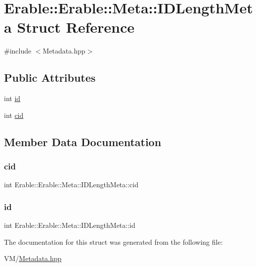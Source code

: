 \hypertarget{struct_erable_1_1_erable_1_1_meta_1_1_i_d_length_meta}{}\section{Erable\+::Erable\+::Meta\+::I\+D\+Length\+Meta Struct Reference}
\label{struct_erable_1_1_erable_1_1_meta_1_1_i_d_length_meta}


{\ttfamily \#include $<$Metadata.\+hpp$>$}

\subsection*{Public Attributes}
\begin{DoxyCompactItemize}
\item 
int \mbox{\hyperlink{struct_erable_1_1_erable_1_1_meta_1_1_i_d_length_meta_a8f91a45b6a95e5b0d7716663dde3687d}{id}}
\item 
int \mbox{\hyperlink{struct_erable_1_1_erable_1_1_meta_1_1_i_d_length_meta_a9ee969f92c8586e3ca9088d518c48f6c}{cid}}
\end{DoxyCompactItemize}


\subsection{Member Data Documentation}
\mbox{\label{struct_erable_1_1_erable_1_1_meta_1_1_i_d_length_meta_a9ee969f92c8586e3ca9088d518c48f6c}} 
\subsubsection{\texorpdfstring{cid}{cid}}
{\footnotesize\ttfamily int Erable\+::\+Erable\+::\+Meta\+::\+I\+D\+Length\+Meta\+::cid}

\mbox{\label{struct_erable_1_1_erable_1_1_meta_1_1_i_d_length_meta_a8f91a45b6a95e5b0d7716663dde3687d}} 
\subsubsection{\texorpdfstring{id}{id}}
{\footnotesize\ttfamily int Erable\+::\+Erable\+::\+Meta\+::\+I\+D\+Length\+Meta\+::id}



The documentation for this struct was generated from the following file\+:\begin{DoxyCompactItemize}
\item 
V\+M/\mbox{\hyperlink{_metadata_8hpp}{Metadata.\+hpp}}\end{DoxyCompactItemize}
